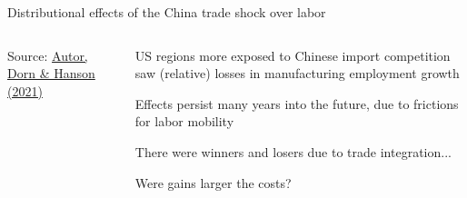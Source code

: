\documentclass[notes,11pt, aspectratio=169, xcolor=table]{beamer}
\newenvironment{wideitemize}{\itemize\addtolength{\itemsep}{10pt}}{\enditemize}
\begin{document}
\begin{frame}{Distributional effects of the China trade shock over labor}


\begin{columns}[T] %
\begin{column}{.45\textwidth}
\centering
    \vspace{12pt}
    { \scriptsize
    Source: \href{https://www.nber.org/system/files/working_papers/w29401/w29401.pdf}{Autor, Dorn \& Hanson (2021)}
    }
\end{column}%
\hfill%
\begin{column}{.55\textwidth}
{\small
\begin{wideitemize}

    \item US regions more exposed to Chinese import competition saw (relative) losses in manufacturing employment growth

    \item Effects persist many years into the future, due to frictions for labor mobility

    \item There were winners and losers due to trade integration...

    \item Were gains larger the costs?

    
\end{wideitemize}
}
\end{column}%
\end{columns}

\end{frame}
\end{document}
